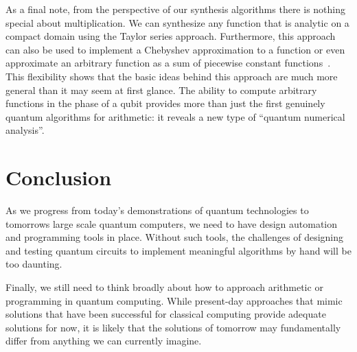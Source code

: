 \documentclass[conference]{IEEEtran}
\begin{document}
As a final note, from the perspective of our synthesis algorithms there is nothing special about multiplication.  We can synthesize any function that is analytic on a compact domain using the Taylor series approach.  Furthermore, this approach can also be used to implement a Chebyshev approximation to a function or even approximate an arbitrary function as a sum of piecewise constant functions~\cite{WR16}.  This flexibility shows that the basic ideas behind this approach are much more general than it may seem at first glance. The ability to compute arbitrary functions in the phase of a qubit provides more than just the first genuinely quantum algorithms for arithmetic: it reveals a new type of ``quantum numerical analysis''.

\section{Conclusion}
As we progress from today's demonstrations of quantum technologies to tomorrows large scale quantum computers, we need to have 
design automation and programming tools in place.  Without such tools, the challenges of designing and testing quantum circuits to implement meaningful
algorithms by hand will be too daunting. 

 Finally, we still need to think broadly about how to approach arithmetic or programming
in quantum computing. While present-day approaches that mimic solutions that have been successful for classical computing provide adequate solutions for now,
it is likely that the solutions of tomorrow may fundamentally differ from anything we can currently imagine.




\end{document}
